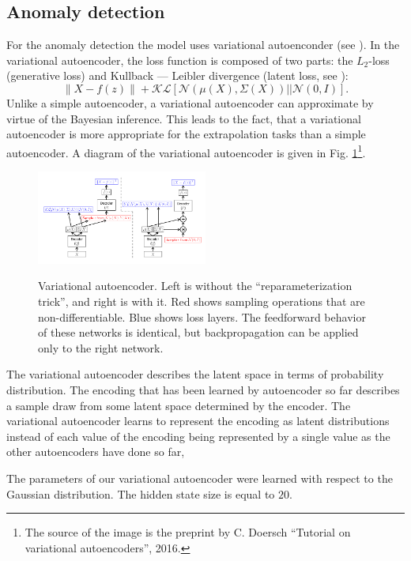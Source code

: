 \documentclass[conference]{ieeetran}
\newcommand{\norm}[1]{\left\lVert#1\right\rVert}
\begin{document}
\subsection{Anomaly detection}

For the anomaly detection the model uses variational autoenconder (see \cite{KingmaWelling2014, RezendeEtAl2014}).
In the variational autoencoder, the loss function is composed of two parts:
 the $L_2$-loss (generative loss) and Kullback --- Leibler divergence (latent loss, see \cite[Appendix B]{KingmaWelling2014}):
$$\norm{X - f(z)} + \mathcal{KL}[\mathcal{N}(\mu(X), \Sigma(X) ) || \mathcal{N}(0, I)].$$
Unlike a simple autoencoder, a variational autoencoder can approximate by virtue of the Bayesian inference.
This leads to the fact, that a variational autoencoder is more appropriate for the extrapolation tasks than a simple autoencoder.
A diagram of the variational autoencoder is given
 in Fig. \ref{vae_gaussian_arch}\footnote{The source of the image is the preprint by C. Doersch ``Tutorial on variational autoencoders'', 2016.}.

\begin{figure}[htbp]
\caption{Variational autoencoder. Left is without the ``reparameterization trick'', and right is with it.
Red shows sampling operations that are non-differentiable.
Blue shows loss layers.
The feedforward behavior of these networks is identical, but backpropagation can be applied only to the right network.
}
\centering
\includegraphics[width=0.5\textwidth]{vae_gaussian_arch}
\label{vae_gaussian_arch}
\end{figure}

The variational autoencoder describes the latent space in terms of probability distribution.
The encoding that has been learned by autoencoder so far describes a sample draw from some latent space
 determined by the encoder.
The variational autoencoder learns to represent the encoding as latent distributions
 instead of each value of the encoding being represented by a single value as the other autoencoders have done so far,

The parameters of our variational autoencoder were learned with respect to the Gaussian distribution.
The hidden state size is equal to $20$.
\end{document}
